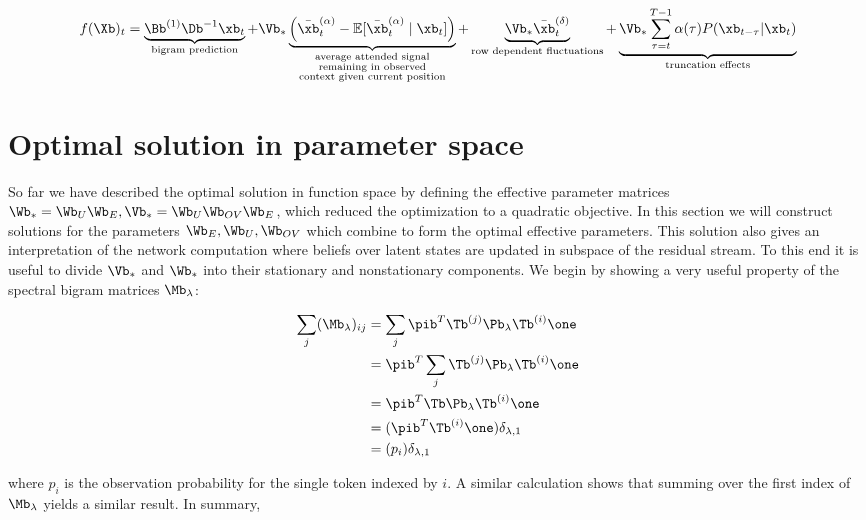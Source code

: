 \documentclass{article}
\begin{document}
\begin{equation}
    f(\Xb)_t = \underbrace{\Bb^{(1)}\Db^{-1}\xb_t}_{\text{bigram prediction}} + \Vb_* \underbrace{\left ( \bar{\xb}_t^{(\alpha)} -  \mathbb{E}[\bar{\xb}_t^{(\alpha)} \mid \xb_t] \right )}_{\substack{\text{average attended signal} \\ \text{remaining in observed} \\\text{context given current position}}} + \underbrace{  \Vb_*\bar{\xb}_t^{(\delta)}}_{\text{row dependent fluctuations}} + \underbrace{ \Vb_*\sum_{\tau = t}^{T-1} \alpha(\tau) P(\xb_{t-\tau} | \xb_{t})}_{\text{truncation effects}}
\end{equation}


\section{Optimal solution in parameter space}
So far we have described the optimal solution in function space by defining the effective parameter matrices $\Wb_* = \Wb_U\Wb_E, \Vb_* = \Wb_U \Wb_{OV}\Wb_E$, which reduced the optimization to a quadratic objective. In this section we will construct solutions for the parameters $\Wb_E, \Wb_U, \Wb_{OV}$ which combine to form the optimal effective parameters. This solution also gives an interpretation of the network computation where beliefs over latent states are updated in subspace of the residual stream. To this end it is useful to divide $\Vb_*$ and $\Wb_*$ into their stationary and nonstationary components. We begin by showing a very useful property of the spectral bigram matrices $\Mb_\lambda$:

\begin{align}
    \sum_j(\Mb_\lambda)_{ij} &= \sum_j \pib^T \Tb^{(j)}\Pb_\lambda\Tb^{(i)}\one\\
    &= \pib^T \sum_j \Tb^{(j)}\Pb_\lambda\Tb^{(i)}\one\\
    &=  \pib^T \Tb\Pb_\lambda\Tb^{(i)}\one \\
    &= (\pib^T \Tb^{(i)}\one) \delta_{\lambda,1} \\
    &= (p_i) \delta_{\lambda,1}
\end{align}

where $p_i$ is the observation probability for the single token indexed by $i$. A similar calculation shows that summing over the first index of $\Mb_\lambda$ yields a similar result. In summary,
\end{document}
